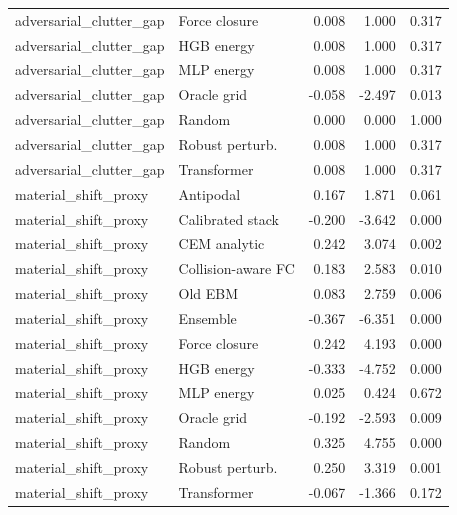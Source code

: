 {\begin{longtable}{llrrr}
adversarial\_clutter\_gap & Force closure & 0.008 & 1.000 & 0.317 \\
adversarial\_clutter\_gap & HGB energy & 0.008 & 1.000 & 0.317 \\
adversarial\_clutter\_gap & MLP energy & 0.008 & 1.000 & 0.317 \\
adversarial\_clutter\_gap & Oracle grid & -0.058 & -2.497 & 0.013 \\
adversarial\_clutter\_gap & Random & 0.000 & 0.000 & 1.000 \\
adversarial\_clutter\_gap & Robust perturb. & 0.008 & 1.000 & 0.317 \\
adversarial\_clutter\_gap & Transformer & 0.008 & 1.000 & 0.317 \\
material\_shift\_proxy & Antipodal & 0.167 & 1.871 & 0.061 \\
material\_shift\_proxy & Calibrated stack & -0.200 & -3.642 & 0.000 \\
material\_shift\_proxy & CEM analytic & 0.242 & 3.074 & 0.002 \\
material\_shift\_proxy & Collision-aware FC & 0.183 & 2.583 & 0.010 \\
material\_shift\_proxy & Old EBM & 0.083 & 2.759 & 0.006 \\
material\_shift\_proxy & Ensemble & -0.367 & -6.351 & 0.000 \\
material\_shift\_proxy & Force closure & 0.242 & 4.193 & 0.000 \\
material\_shift\_proxy & HGB energy & -0.333 & -4.752 & 0.000 \\
material\_shift\_proxy & MLP energy & 0.025 & 0.424 & 0.672 \\
material\_shift\_proxy & Oracle grid & -0.192 & -2.593 & 0.009 \\
material\_shift\_proxy & Random & 0.325 & 4.755 & 0.000 \\
material\_shift\_proxy & Robust perturb. & 0.250 & 3.319 & 0.001 \\
material\_shift\_proxy & Transformer & -0.067 & -1.366 & 0.172 \\
\bottomrule
\end{longtable}
}
